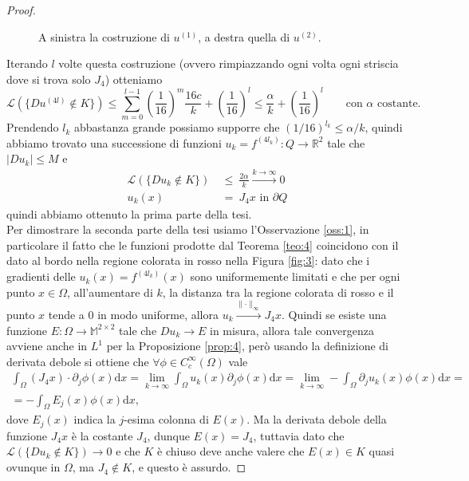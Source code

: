 \documentclass[a4paper,11pt]{book}
\theoremstyle{plain}
\theoremstyle{definition}
\theoremstyle{remark}
\newcommand{\R}{\mathbb{R}}
\newcommand{\M}{\mathbb{M}}
\newcommand{\LL}{\mathscr{L}}
\newcommand{\norm}[1]{\lVert#1\rVert}
\newcommand{\dx}{\text{d}x}
\begin{document}
\begin{proof}
\begin{figure}[H]
\begin{tikzpicture}[line cap=round,line join=round,x=1.3cm,y=1.3cm]
		\end{tikzpicture}
		\caption{A sinistra la costruzione di $u^{(1)}$, a destra quella di $u^{(2)}$.}
		\label{fig:1}
	\end{figure}
	Iterando $l$ volte questa costruzione (ovvero rimpiazzando ogni volta ogni striscia dove si trova solo $J_4$) otteniamo
	\[
		\LL(\{Du^{(4l)}\not\in K\}) \leq \sum_{m=0}^{l-1}\left( \frac{1}{16}\right)^m\frac{16c}{k} + \left( \frac{1}{16}\right)^l \leq \frac{\alpha}{k} + \left( \frac{1}{16}\right)^l\qquad \text{con }\alpha\text{ costante}.
	\]
	Prendendo $l_k$ abbastanza grande possiamo supporre che $(1/16)^{l_k}\leq \alpha/k$, quindi abbiamo trovato una successione di funzioni $u_k = f^{(4l_k)}:Q\to\R^2$ tale che $|Du_k|\leq M$ e
	\begin{align*}
		\LL(\{Du_k\not\in K\})\ &\leq\ \frac{2\alpha}{k}\xrightarrow{k\to\infty} 0\\
		u_k(x)\ &=\ J_4x\text{ in }\partial Q
	\end{align*}
	quindi abbiamo ottenuto la prima parte della tesi.\\
	Per dimostrare la seconda parte della tesi usiamo l'Osservazione \ref{oss:1}, in particolare il fatto che le funzioni prodotte dal Teorema \ref{teo:4} coincidono con il dato al bordo nella regione colorata in rosso nella Figura \ref{fig:3}: dato che i gradienti delle $u_{k}(x)=f^{(4l_{k})}(x)$ sono uniformemente limitati e che per ogni punto $x\in \Omega$, all'aumentare di $k$, la distanza tra la regione colorata di rosso e il punto $x$ tende a $0$ in modo uniforme, allora $u_{k}\xrightarrow{\norm{\cdot}_{\infty}}J_{4}x$. Quindi se esiste una funzione $E:\Omega\to\M^{2\times 2}$ tale che $Du_{k}\to E$ in misura, allora tale convergenza avviene anche in $L^{1}$ per la Proposizione \ref{prop:4}, però usando la definizione di derivata debole si ottiene che $\forall \phi\in C^{\infty}_{c}(\Omega)$ vale
	\begin{multline*}
		\int_{\Omega}(J_{4}x)\cdot\partial_{j}\phi(x)\dx=\lim_{k\to\infty}\int_{\Omega}u_{k}(x)\partial_{j}\phi(x)\dx = \lim_{k\to\infty}-\int_{\Omega}\partial_{j}u_{k}(x)\phi(x)\dx = \\=-\int_{\Omega}E_{j}(x)\phi(x)\dx,
	\end{multline*}
	dove $E_{j}(x)$ indica la $j$-esima colonna di $E(x)$. Ma la derivata debole della funzione $J_{4}x$ è la costante $J_{4}$, dunque $E(x)=J_{4}$, tuttavia dato che $\LL(\{Du_k\not\in K\})\to 0$ e che $K$ è chiuso deve anche valere che $E(x)\in K$ quasi ovunque in $\Omega$, ma $J_{4}\not\in K$, e questo è assurdo.
	

\end{proof}
\end{document}
